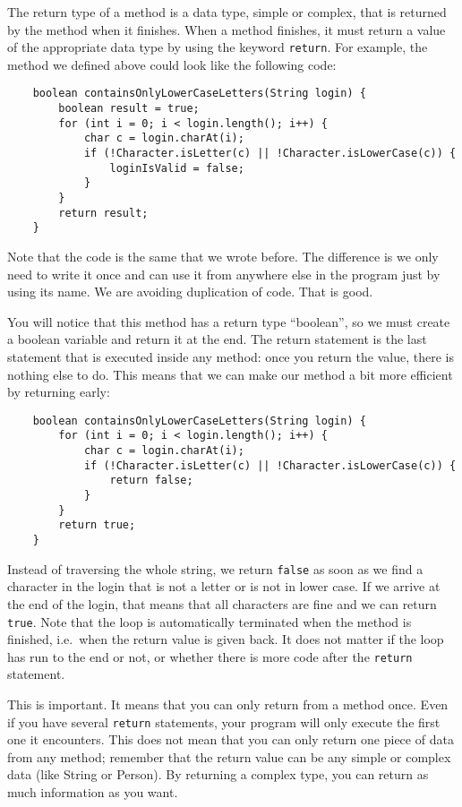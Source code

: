 The return type of a method is a data type, simple or complex, that is
returned by the method when it finishes. When a method finishes, it
must return a value of the appropriate data type by using the keyword
\verb+return+. For example, the method we defined above could look
like the following code:

\begin{verbatim}
    boolean containsOnlyLowerCaseLetters(String login) {
        boolean result = true;
        for (int i = 0; i < login.length(); i++) {
            char c = login.charAt(i);
            if (!Character.isLetter(c) || !Character.isLowerCase(c)) {
                loginIsValid = false;
            }
        }
        return result;
    }
\end{verbatim}

Note that the code is the same that we wrote before. The difference is
we only need to write it once and can use it from anywhere else in the
program just by using its name. We are avoiding duplication of
code. That is good. 

You will notice that this method has a return type ``boolean'', so we
must create a boolean variable and return it at the end. The return
statement is the last statement that is executed inside any method:
once you return the value, there is nothing else to do. This means
that we can make our method a bit more efficient by returning early: 

\begin{verbatim}
    boolean containsOnlyLowerCaseLetters(String login) {
        for (int i = 0; i < login.length(); i++) {
            char c = login.charAt(i);
            if (!Character.isLetter(c) || !Character.isLowerCase(c)) {
                return false;
            }
        }
        return true;
    }
\end{verbatim}

Instead of traversing the whole string, we return \verb+false+ as soon
as we find a character in the login that is not a letter or is not
in lower case. If we arrive at the end of the login, that means that
all characters are fine and we can return \verb+true+. Note that the
loop is automatically terminated when the method is finished,
i.e.~when the return value is given back. It does not matter if the
loop has run to the end or not, or whether there is more code after
the \verb+return+ statement. 

This is important.
It means that you can only return from a method once. Even if you have
several \verb+return+ statements, your program will only execute the
first one it encounters. This does not mean that you can only return
one piece of data from any method; remember that the return value can
be any simple or complex data (like String or Person). By returning a
complex type, you can return as much information as you want. 

